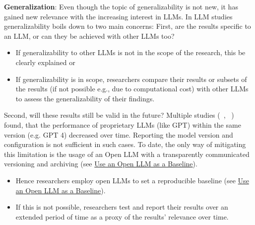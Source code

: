 \textbf{Generalization}:
Even though the topic of generalizability is not new, it has gained new relevance with the increasing interest in LLMs. In LLM studies generalizability boils down to two main concerns: 
First, are the results specific to an LLM, or can they be achieved with other LLMs too? 
\begin{itemize}
  \item If generalizability to other LLMs is not in the scope of the research, this \must be clearly explained or
  \item If generalizability is in scope, researchers \must compare their results or subsets of the results (if not possible e.g., due to computational cost) with other LLMs to assess the generalizability of their findings. 
\end{itemize}
Second, will these results still be valid in the future? Multiple studies (~\cite{DBLP:journals/corr/abs-2307-09009}, ~\cite{doi:10.1148/radiol.232411}) found, that the performance of proprietary LLMs (like GPT) within the same version (e.g. GPT 4) decreased over time. Reporting the model version and configuration is not sufficient in such cases. To date, the only way of mitigating this limitation is the usage of an Open LLM with a transparently communicated versioning and archiving (see \href{/guidelines/#use-open-llm}{Use an Open LLM as a Baseline}). 
\begin{itemize}
  \item Hence researchers \should employ open LLMs to set a reproducible baseline (see \href{/guidelines/#use-open-llm}{Use an Open LLM as a Baseline}).
  \item If this is not possible, researchers \should test and report their results over an extended period of time as a proxy of the results' relevance over time.
\end{itemize}

